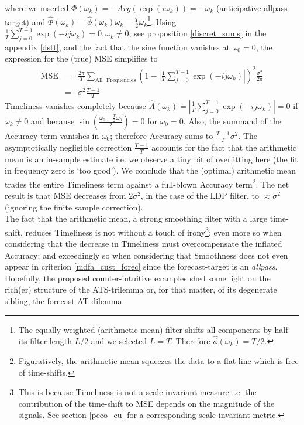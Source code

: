 \documentclass[a4paper]{book}
\begin{document}
where we inserted $\Phi(\omega_k)=-Arg(\exp(i\omega_k))=-\omega_k$ (anticipative allpass target) and $\hat{\Phi}(\omega_k)=\hat{\phi}(\omega_k)\omega_k=\displaystyle{\frac{T}{2}}\omega_k$\footnote{The equally-weighted (arithmetic mean) filter shifts all components by half its filter-length $L/2$ and we selected $L=T$. Therefore $\hat{\phi}(\omega_k)=T/2$.}. 
Using $\frac{1}{T}\sum_{j=0}^{T-1}\exp(-ij\omega_k)=0, \omega_k\not= 0$, see proposition \ref{discret_sums} in the appendix \ref{dstt}, and the fact that the sine function vanishes at $\omega_0=0$, the expression for the (true) MSE simplifies to
\begin{eqnarray}
\textrm{MSE}&=&\frac{2\pi}{ T} \sum_{\textrm{All ~Frequencies}} \left(1-\left|\frac{1}{T}\sum_{j=0}^{T-1}\exp(-ij\omega_k)\right|\right)^2\frac{\sigma^2}{2\pi} \nonumber\\
&=&\sigma^2\frac{T-1}{T}\label{mse_ins}
\end{eqnarray}
Timeliness vanishes completely because $\hat{A}(\omega_k)=\left|\frac{1}{T}\sum_{j=0}^{T-1}\exp(-ij\omega_k)\right|=0$ if $\omega_k\neq 0$ and because $\sin\left(\frac{\omega_0-\frac{T}{2}\omega_0}{2}\right)=0$ for $\omega_0=0$. Also, the summand of the Accuracy term vanishes in $\omega_0$; therefore Accuracy sums to $\displaystyle{\frac{T-1}{T}}\sigma^2$. The asymptotically negligible correction $\displaystyle{\frac{T-1}{T}}$ accounts for the fact that the arithmetic mean is an in-sample estimate i.e. we observe a tiny bit of overfitting here (the fit in frequency zero is `too good'). We conclude that the (optimal) arithmetic mean trades the entire Timeliness term against a full-blown Accuracy term\footnote{Figuratively, the arithmetic mean squeezes the data to a flat line which is free of time-shifts.}. The net result is that MSE decreases from $2\sigma^2$, in the case of the LDP filter, to $\approx\sigma^2$ (ignoring the finite sample correction).\\

The fact that the arithmetic mean, a strong smoothing filter with a large time-shift, reduces Timeliness is not without a touch of irony\footnote{This is because Timeliness is not a scale-invariant measure i.e. the contribution of the time-shift to MSE depends on the magnitude of the signals. See section \ref{peco_cu} for a corresponding scale-invariant metric.}; even more so when considering that the decrease in Timeliness must overcompensate the inflated Accuracy; and exceedingly so when considering that Smoothness does not even appear in criterion \ref{mdfa_cust_forec} since the forecast-target is an \emph{allpass}. Hopefully, the proposed counter-intuitive examples shed some light on the rich(er) structure of the ATS-trilemma or, for that matter, of its degenerate sibling, the forecast AT-dilemma. 
\end{document}
